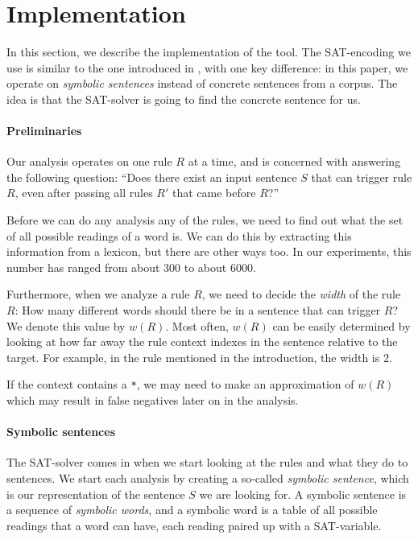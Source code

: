 \section{Implementation}
\label{sec:implementation}

In this section, we describe the implementation of the tool.
The SAT-encoding we use is similar to the one introduced in \cite{listenmaa_claessen2015}, with one key difference: in this paper, we operate on {\em symbolic sentences} instead of concrete sentences from a corpus. The idea is that the SAT-solver is going to find the concrete sentence for us.

\paragraph{Preliminaries}

Our analysis operates on one rule $R$ at a time, and is concerned with answering the following question: ``Does there exist an input sentence $S$ that can trigger rule $R$, even after passing all rules $R'$ that came before $R$?''

Before we can do any analysis any of the rules, we need to find out what the set of all possible readings of a word is. We can do this by extracting this information from a lexicon, but there are other ways too. In our experiments, this number has ranged from about 300 to about 6000. 

Furthermore, when we analyze a rule $R$, we need to decide the {\em width} of the rule $R$: How many different words should there be in a sentence that can trigger $R$? We denote this value by $w(R)$. Most often, $w(R)$ can be easily determined by looking at how far away the rule context indexes in the sentence relative to the target. For example, in the rule mentioned in the introduction, the width is 2.

If the context contains a \verb!*!, we may need to make an approximation of $w(R)$ which may result in false negatives later on in the analysis.

\paragraph{Symbolic sentences}

The SAT-solver comes in when we start looking at the rules and what they do to sentences. We start each analysis by creating a so-called {\em symbolic sentence}, which is our representation of the sentence $S$ we are looking for. A symbolic sentence is a sequence of {\em symbolic words}, and a symbolic word is a table of all possible readings that a word can have, each reading paired up with a SAT-variable.

